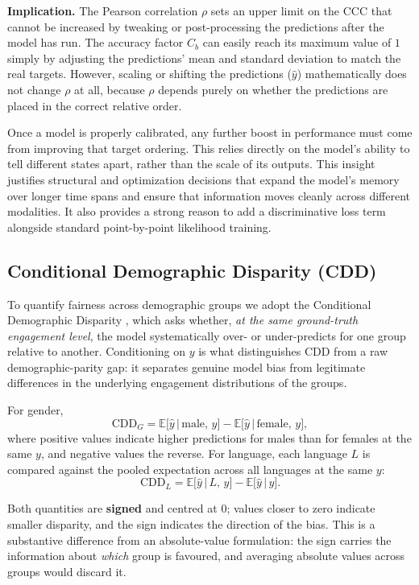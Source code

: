 \documentclass[11pt,a4paper]{article}
\begin{document}
	\textbf{Implication.} The Pearson correlation $\rho$ sets an upper limit on the CCC that cannot be increased by tweaking or post-processing the predictions after the model has run. The accuracy factor $C_b$ can easily reach its maximum value of $1$ simply by adjusting the predictions' mean and standard deviation to match the real targets. However, scaling or shifting the predictions ($\hat{y}$) mathematically does not change $\rho$ at all, because $\rho$ depends purely on whether the predictions are placed in the correct relative order.

	Once a model is properly calibrated, any further boost in performance must come from improving that target ordering. This relies directly on the model's ability to tell different states apart, rather than the scale of its outputs. This insight justifies structural and optimization decisions that expand the model's memory over longer time spans and ensure that information moves cleanly across different modalities. It also provides a strong reason to add a discriminative loss term alongside standard point-by-point likelihood training.

	\subsection{Conditional Demographic Disparity (CDD)}
	To quantify fairness across demographic groups we adopt the Conditional Demographic Disparity \cite{wachter2021, withanage25}, which asks whether, \emph{at the same ground-truth engagement level}, the model systematically over- or under-predicts for one group relative to another. Conditioning on $y$ is what distinguishes CDD from a raw demographic-parity gap: it separates genuine model bias from legitimate differences in the underlying engagement distributions of the groups.
	
	For gender,
	$$
	\text{CDD}_G = \mathbb{E}\bigl[\hat{y} \,\big|\, \text{male},\, y\bigr] - \mathbb{E}\bigl[\hat{y} \,\big|\, \text{female},\, y\bigr],
	$$
	where positive values indicate higher predictions for males than for females at the same $y$, and negative values the reverse. For language, each language $L$ is compared against the pooled expectation across all languages at the same $y$:
	$$
	\text{CDD}_L = \mathbb{E}\bigl[\hat{y} \,\big|\, L,\, y\bigr] - \mathbb{E}\bigl[\hat{y} \,\big|\, y\bigr].
	$$
	
	Both quantities are \textbf{signed} and centred at $0$; values closer to zero indicate smaller disparity, and the sign indicates the direction of the bias. This is a substantive difference from an absolute-value formulation: the sign carries the information about \emph{which} group is favoured, and averaging absolute values across groups would discard it.
	
\end{document}
